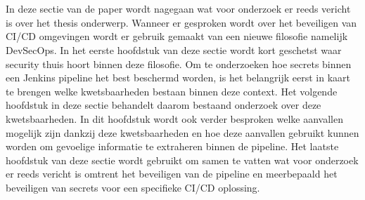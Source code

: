 \chapter{}%
\label{ch:stand-van-zaken}



In deze sectie van de paper wordt nagegaan wat voor onderzoek er reeds vericht is over het thesis onderwerp. Wanneer er gesproken wordt over het beveiligen van CI/CD omgevingen wordt er gebruik gemaakt van een nieuwe filosofie namelijk DevSecOps. In het eerste hoofdstuk van deze sectie wordt kort geschetst waar security thuis hoort binnen deze filosofie. Om te onderzoeken hoe secrets binnen een Jenkins pipeline het best beschermd worden, is het belangrijk eerst in kaart te brengen welke kwetsbaarheden bestaan binnen deze context. Het volgende hoofdstuk in deze sectie behandelt daarom bestaand onderzoek over deze kwetsbaarheden. In dit hoofdstuk wordt ook verder besproken welke aanvallen mogelijk zijn dankzij deze kwetsbaarheden en hoe deze aanvallen gebruikt kunnen worden om gevoelige informatie te extraheren binnen de pipeline. Het laatste hoofdstuk van deze sectie wordt gebruikt om samen te vatten wat voor onderzoek er reeds vericht is omtrent het beveiligen van de pipeline en meerbepaald het beveiligen van secrets voor een specifieke CI/CD oplossing.

\section{}
\label{sec:DevSecOps binnen de pipeline}

